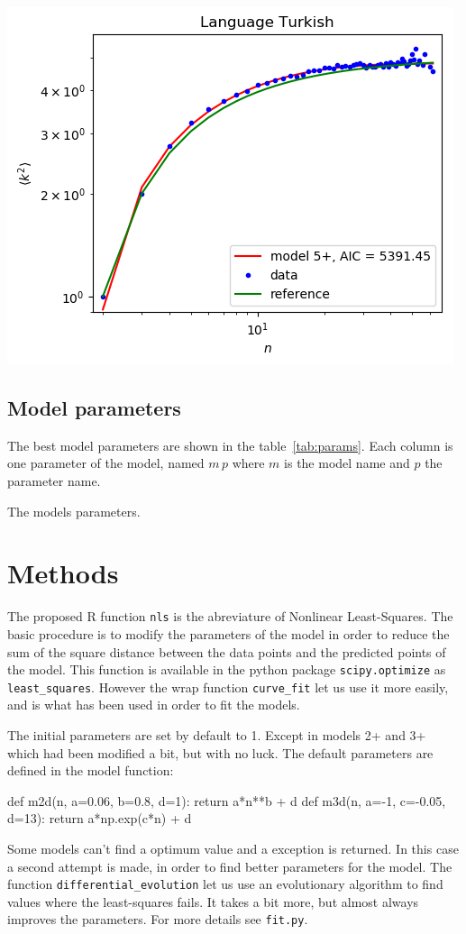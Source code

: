 \documentclass[a4paper]{article}
\begin{document}
\includegraphics[width=.5\textwidth]{fig/Turkish-mean.png}

\subsection{Model parameters}
The best model parameters are shown in the table~\ref{tab:params}. Each column 
is one parameter of the model, named $m\, p$ where $m$ is the model name and $p$ 
the parameter name.
%
\begin{table}[h]
	\centering
	\footnotesize
	
	
	
	\caption{The models parameters.}
	\label{tab:params}
\end{table}
%
\section{Methods}
%
%
The proposed R function \texttt{nls} is the abreviature of Nonlinear 
Least-Squares. The basic procedure is to modify the parameters of the model in 
order to reduce the sum of the square distance between the data points and the 
predicted points of the model.
%
This function is available in the python package \texttt{scipy.optimize} as 
\texttt{least\_squares}. However the wrap function \texttt{curve\_fit} let us 
use it more easily, and is what has been used in order to fit the models.

The initial parameters are set by default to 1. Except in models 2+ and 3+ which 
had been modified a bit, but with no luck. The default parameters are defined in 
the model function:
%
\begin{pycode}
def m2d(n, a=0.06, b=0.8, d=1):   return a*n**b + d
def m3d(n, a=-1, c=-0.05, d=13):  return a*np.exp(c*n) + d
\end{pycode}
%
Some models can't find a optimum value and a exception is returned. In this case 
a second attempt is made, in order to find better parameters for the model. The 
function \texttt{differential\_evolution} let us use an evolutionary algorithm 
to find values where the least-squares fails. It takes a bit more, but almost 
always improves the parameters. For more details see \texttt{fit.py}.
%
\end{document}
